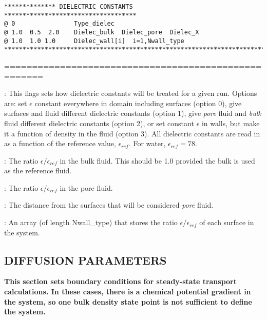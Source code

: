 \documentclass[10pt,onecolumn]{article}
\begin{document}
\begin{verbatim}
************** DIELECTRIC CONSTANTS ************************************
@ 0                Type_dielec
@ 1.0  0.5  2.0    Dielec_bulk  Dielec_pore  Dielec_X
@ 1.0  1.0 1.0     Dielec_wall[i]  i=1,Nwall_type
***********************************************************************
\end{verbatim}

\noindent=====================================================
\vspace{0.1in}


\vspace{0.1in}
:  This flags sets how dielectric
constants will be treated for a given run.  Options are: set
$\epsilon$ constant everywhere in domain including surfaces (option 0),
give surfaces and fluid different dielectric constants (option 1),
give {\it pore} fluid and {\it bulk} fluid different dielectric
constants (option 2), or set constant $\epsilon$ in walls, but
make it a function of density in the fluid (option 3).  All
dielectric constants are read in as a function of the reference
value, $\epsilon_{ref}$.  For water, $\epsilon_{ref}=78$.

\vspace{0.1in}
: The ratio $\epsilon/\epsilon_{ref}$
in the bulk fluid.  This should be 1.0 provided the bulk is
used as the reference fluid.

\vspace{0.1in}
: The ratio $\epsilon/\epsilon_{ref}$
in the pore fluid.

\vspace{0.1in}
:  The distance from the surfaces that
will be considered {\it pore} fluid.

\vspace{0.1in}
:  An array (of length Nwall\_type) that
stores the ratio $\epsilon/\epsilon_{ref}$ of each surface in the system.

\vfill
\break

\subsection{DIFFUSION PARAMETERS}
{\bf  This
section sets boundary conditions for steady-state transport
calculations.  In these cases, there is a chemical potential
gradient in the system, so one bulk density state point is not
sufficient to define the system.}
\end{document}
